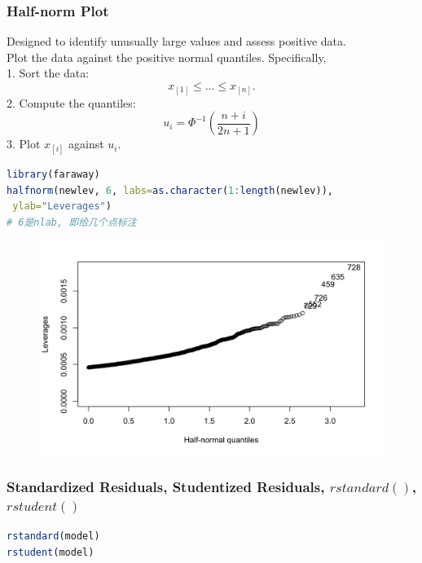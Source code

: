 \documentclass[11pt,a4paper]{article}
\begin{document}
\subsubsection{Half-norm Plot}
Designed to identify unusually large values and assess positive data.\\
Plot the data against the positive normal quantiles. Speciﬁcally,\\
1. Sort the data:
$$x_{[1]} \leq ... \leq x_{[n]}.$$
2. Compute the quantiles:
$$u_i=\Phi^{-1}(\frac{n+i}{2n+1})$$
3. Plot $x_{[i]}$ against $u_i$.
\begin{lstlisting}[language=R]
library(faraway)
halfnorm(newlev, 6, labs=as.character(1:length(newlev)),
 ylab="Leverages")
# 6是nlab, 即给几个点标注
\end{lstlisting}
\begin{center}\begin{figure}[htbp]
  \centering
  \includegraphics[scale=0.3]{week402.png}
  \caption{}
  \label{}
\end{figure}\end{center}

\subsubsection{Standardized Residuals, Studentized Residuals, $rstandard()$, $rstudent()$}
\begin{lstlisting}[language=R]
rstandard(model)
rstudent(model)
\end{lstlisting}
\end{document}
